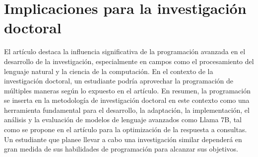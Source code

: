 \documentclass[12pt,twocolumn]{article}
\begin{document}

\section{Implicaciones para la investigación doctoral}
El artículo destaca la influencia significativa de la programación avanzada en el desarrollo de la investigación, especialmente en campos como el procesamiento del lenguaje natural y la ciencia de la computación.
En el contexto de la investigación doctoral, un estudiante podría aprovechar la programación de múltiples maneras según lo expuesto en el artículo.
En resumen, la programación se inserta en la metodología de investigación doctoral en este contexto como una herramienta fundamental para el desarrollo, la adaptación, la implementación, el análisis y la evaluación de modelos de lenguaje avanzados como Llama 7B, tal como se propone en el artículo para la optimización de la respuesta a consultas. 
Un estudiante que planee llevar a cabo una investigación similar dependerá en gran medida de sus habilidades de programación para alcanzar sus objetivos.
\end{document}
